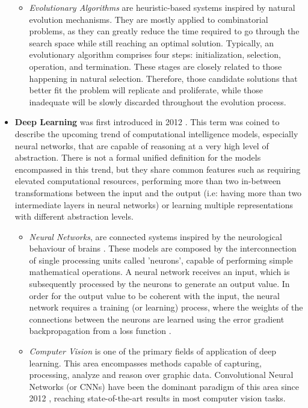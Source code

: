 \begin{itemize}
\begin{itemize}
        \item \textit{Evolutionary Algorithms} \citep{GALVAN2003573} are heuristic-based systems inspired by natural evolution mechanisms. They are mostly applied to combinatorial problems, as they can greatly reduce the time required to go through the search space while still reaching an optimal solution. Typically, an evolutionary algorithm comprises four steps: initialization, selection, operation, and termination. These stages are closely related to those happening in natural selection. Therefore, those candidate solutions that better fit the problem will replicate and proliferate, while those inadequate will be slowly discarded throughout the evolution process. 
    \end{itemize}
    \item \textbf{Deep Learning} was first introduced in 2012 \citep{bengio_2012_dl_review}. This term was coined to describe the upcoming trend of computational intelligence models, especially neural networks, that are capable of reasoning at a very high level of abstraction. There is not a formal unified definition for the models encompassed in this trend, but they share common features such as requiring elevated computational resources, performing more than two in-between transformations between the input and the output (i.e: having more than two intermediate layers in neural networks) or learning multiple representations with different abstraction levels.
    \begin{itemize}
        \item \textit{Neural Networks}, are connected systems inspired by the neurological behaviour of brains \citep{Rosenblatt58theperceptron:}. These models are composed by the interconnection of single processing units called 'neurons', capable of performing simple mathematical operations. A neural network receives an input, which is subsequently processed by the neurons to generate an output value. In order for the output value to be coherent with the input, the neural network requires a training (or learning) process, where the weights of the connections between the neurons are learned using the error gradient backpropagation from a loss function \citep{rumelhart_1987_backpropagation}.  
        
        \item \textit{Computer Vision} is one of the primary fields of application of deep learning. This area encompasses methods capable of capturing, processing, analyze and reason over graphic data. Convolutional Neural Networks (or CNNs) have been the dominant paradigm of this area since 2012 \citep{alexnet}, reaching state-of-the-art results in most computer vision tasks.
        

\end{itemize}
\end{itemize}
